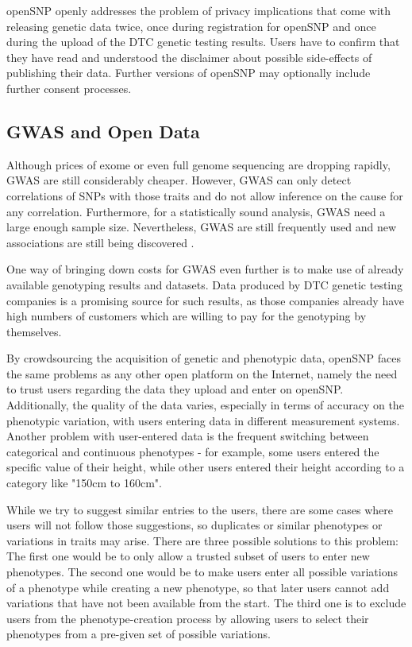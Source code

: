 \documentclass[10pt]{article}
\begin{document}
openSNP openly addresses the problem of privacy implications that come with releasing genetic data twice, once during registration for openSNP and once during 
the upload of the DTC genetic testing results. Users have to confirm that they have read and understood the disclaimer about possible side-effects 
of publishing their data. Further versions of openSNP may optionally include further consent processes.


\subsection*{GWAS and Open Data}
Although prices of exome or even full genome sequencing are dropping rapidly, GWAS are still considerably cheaper. However, GWAS can only detect correlations of SNPs with those traits and do not allow 
inference on the cause for any correlation. Furthermore, for a statistically sound analysis, GWAS need a large enough sample size. Nevertheless, GWAS are still frequently used and new associations are still being discovered \cite{10.1371.journal.pone.0031470,10.1371.journal.pone.0030309,10.1371.journal.pone.0029848}. 

One way of bringing down costs for GWAS even further is to make use of already available genotyping results and datasets. 
Data produced by DTC genetic testing companies is a promising source for such results, as those companies already have high 
numbers of customers which are willing to pay for the genotyping by themselves.

By crowdsourcing the acquisition of genetic and phenotypic data, openSNP faces the same problems as any other 
open platform on the Internet, namely the need to trust users regarding the data they upload and enter on openSNP. 
Additionally, the quality of the data varies, especially in terms of accuracy on the phenotypic variation, 
with users entering data in different measurement systems. Another problem with user-entered data is the frequent switching between categorical and continuous phenotypes - for example, some users entered the specific value of their height, while other users entered their height according to a category like "150cm to 160cm". 

While we try to suggest similar entries to the users, 
there are some cases where users will not follow those suggestions, so duplicates or similar phenotypes or variations in traits may arise. There are three possible solutions to this problem: The first one would be to only allow a trusted subset of users to enter new phenotypes. The second one 
would be to make users enter all possible variations of a phenotype while creating a new phenotype, so that later users cannot add 
variations that have not been available from the start. The third one is to exclude users from the phenotype-creation process by allowing users to select their phenotypes from a pre-given set of possible variations.
\end{document}
